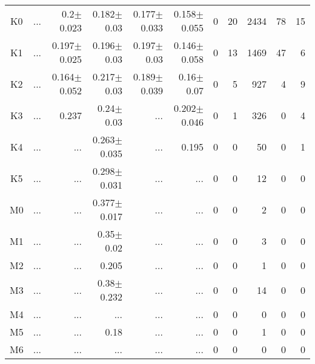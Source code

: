 \begin{table}[t]
\begin{center}
\begin{tabular}{c|rrrrr|rrrrr}
K0	&	 ...	&	0.2$\pm$0.023	&	0.182$\pm$0.03	&	0.177$\pm$0.033	&	0.158$\pm$0.055	&	0	&	20	&	2434	&	78	&	15	\\
K1	&	 ...	&	0.197$\pm$0.025	&	0.196$\pm$0.03	&	0.197$\pm$0.03	&	0.146$\pm$0.058	&	0	&	13	&	1469	&	47	&	6	\\
K2	&	 ...	&	0.164$\pm$0.052	&	0.217$\pm$0.03	&	0.189$\pm$0.039	&	0.16$\pm$0.07	&	0	&	5	&	927	&	4	&	9	\\
K3	&	 ...	&	0.237	&	0.24$\pm$0.03	&	 ...	&	0.202$\pm$0.046	&	0	&	1	&	326	&	0	&	4	\\
K4	&	 ...	&	 ...	&	0.263$\pm$0.035	&	 ...	&	0.195	&	0	&	0	&	50	&	0	&	1	\\
K5	&	 ...	&	 ...	&	0.298$\pm$0.031	&	 ...	&	 ...	&	0	&	0	&	12	&	0	&	0	\\
M0	&	 ...	&	 ...	&	0.377$\pm$0.017	&	 ...	&	 ...	&	0	&	0	&	2	&	0	&	0	\\
M1	&	 ...	&	 ...	&	0.35$\pm$0.02	&	 ...	&	 ...	&	0	&	0	&	3	&	0	&	0	\\
M2	&	 ...	&	 ...	&	0.205	&	 ...	&	 ...	&	0	&	0	&	1	&	0	&	0	\\
M3	&	 ...	&	 ...	&	0.38$\pm$0.232	&	 ...	&	 ...	&	0	&	0	&	14	&	0	&	0	\\
M4	&	 ...	&	 ...	&	 ...	&	 ...	&	 ...	&	0	&	0	&	0	&	0	&	0	\\
M5	&	 ...	&	 ...	&	0.18	&	 ...	&	 ...	&	0	&	0	&	1	&	0	&	0	\\
M6	&	 ...	&	 ...	&	 ...	&	 ...	&	 ...	&	0	&	0	&	0	&	0	&	0	\\
    \bottomrule
    \end{tabular}
\end{center}
\end{table}


